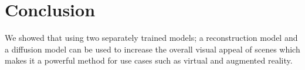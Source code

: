\section{Conclusion}
\label{sec:conclusion}

We showed that using two separately trained models; a reconstruction model and a diffusion model can be used to increase the overall visual appeal of scenes which makes it a powerful method for use cases such as virtual and augmented reality.
